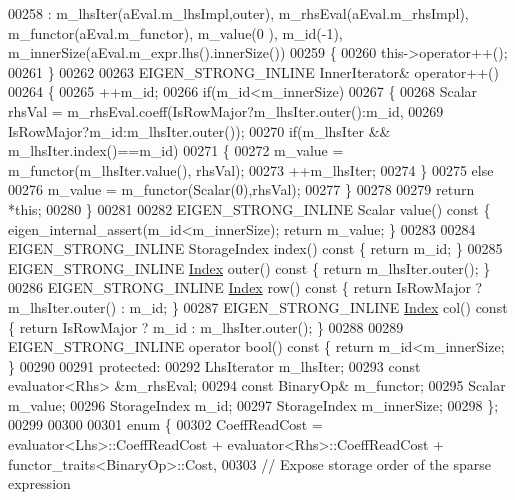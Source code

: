 \begin{DoxyCode}
00258       : m\_lhsIter(aEval.m\_lhsImpl,outer), m\_rhsEval(aEval.m\_rhsImpl), m\_functor(aEval.m\_functor), m\_value(0
      ), m\_id(-1), m\_innerSize(aEval.m\_expr.lhs().innerSize())
00259     \{
00260       this->operator++();
00261     \}
00262 
00263     EIGEN\_STRONG\_INLINE InnerIterator& operator++()
00264     \{
00265       ++m\_id;
00266       \textcolor{keywordflow}{if}(m\_id<m\_innerSize)
00267       \{
00268         Scalar rhsVal = m\_rhsEval.coeff(IsRowMajor?m\_lhsIter.outer():m\_id,
00269                                         IsRowMajor?m\_id:m\_lhsIter.outer());
00270         \textcolor{keywordflow}{if}(m\_lhsIter && m\_lhsIter.index()==m\_id)
00271         \{
00272           m\_value = m\_functor(m\_lhsIter.value(), rhsVal);
00273           ++m\_lhsIter;
00274         \}
00275         \textcolor{keywordflow}{else}
00276           m\_value = m\_functor(Scalar(0),rhsVal);
00277       \}
00278 
00279       \textcolor{keywordflow}{return} *\textcolor{keyword}{this};
00280     \}
00281 
00282     EIGEN\_STRONG\_INLINE Scalar value()\textcolor{keyword}{ const }\{ eigen\_internal\_assert(m\_id<m\_innerSize); \textcolor{keywordflow}{return} m\_value; \}
00283 
00284     EIGEN\_STRONG\_INLINE StorageIndex index()\textcolor{keyword}{ const }\{ \textcolor{keywordflow}{return} m\_id; \}
00285     EIGEN\_STRONG\_INLINE \hyperlink{namespace_eigen_a62e77e0933482dafde8fe197d9a2cfde}{Index} outer()\textcolor{keyword}{ const }\{ \textcolor{keywordflow}{return} m\_lhsIter.outer(); \}
00286     EIGEN\_STRONG\_INLINE \hyperlink{namespace_eigen_a62e77e0933482dafde8fe197d9a2cfde}{Index} row()\textcolor{keyword}{ const }\{ \textcolor{keywordflow}{return} IsRowMajor ? m\_lhsIter.outer() : m\_id; \}
00287     EIGEN\_STRONG\_INLINE \hyperlink{namespace_eigen_a62e77e0933482dafde8fe197d9a2cfde}{Index} col()\textcolor{keyword}{ const }\{ \textcolor{keywordflow}{return} IsRowMajor ? m\_id : m\_lhsIter.outer(); \}
00288 
00289     EIGEN\_STRONG\_INLINE \textcolor{keyword}{operator} bool()\textcolor{keyword}{ const }\{ \textcolor{keywordflow}{return} m\_id<m\_innerSize; \}
00290 
00291   \textcolor{keyword}{protected}:
00292     LhsIterator m\_lhsIter;
00293     \textcolor{keyword}{const} evaluator<Rhs> &m\_rhsEval;
00294     \textcolor{keyword}{const} BinaryOp& m\_functor;
00295     Scalar m\_value;
00296     StorageIndex m\_id;
00297     StorageIndex m\_innerSize;
00298   \};
00299 
00300 
00301   \textcolor{keyword}{enum} \{
00302     CoeffReadCost = evaluator<Lhs>::CoeffReadCost + evaluator<Rhs>::CoeffReadCost + 
      functor\_traits<BinaryOp>::Cost,
00303     \textcolor{comment}{// Expose storage order of the sparse expression}

\end{DoxyCode}
